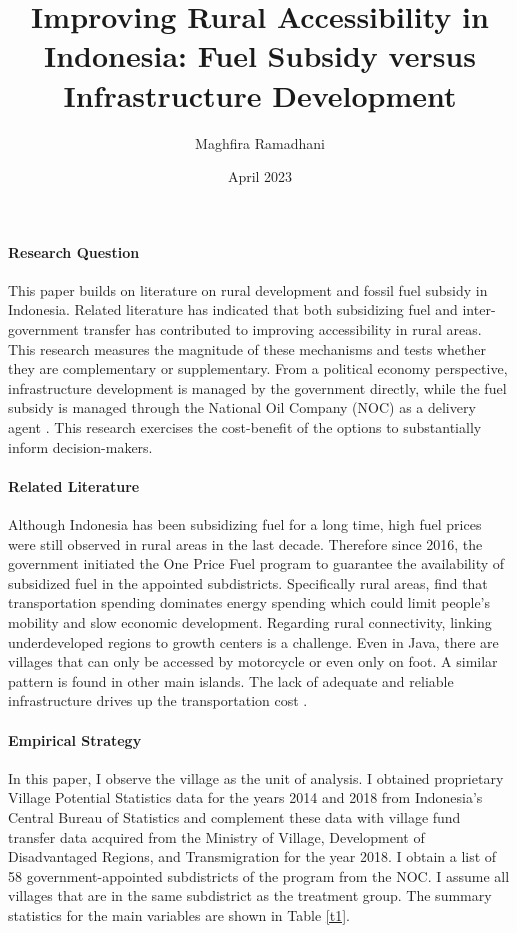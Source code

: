 \documentclass[letterpaper,11pt,leqno]{article}
\begin{document}
\title{Improving Rural Accessibility in Indonesia: Fuel Subsidy versus Infrastructure Development}
\author{Maghfira Ramadhani}
\date{April 2023}       
\maketitle
 
\paragraph{Research Question} This paper builds on literature on rural development and fossil fuel subsidy in Indonesia. Related literature has indicated that both subsidizing fuel and inter-government transfer has contributed to improving accessibility in rural areas. This research measures the magnitude of these mechanisms and tests whether they are complementary or supplementary. From a political economy perspective, infrastructure development is managed by the government directly, while the fuel subsidy is managed through the National Oil Company (NOC) as a delivery agent \citep{ichsan_2022}. This research exercises the cost-benefit of the options to substantially inform decision-makers.

\paragraph{Related Literature} Although Indonesia has been subsidizing fuel for a long time, high fuel prices were still observed in rural areas in the last decade. Therefore since 2016, the government initiated the One Price Fuel program to guarantee the availability of subsidized fuel in the appointed subdistricts. Specifically rural areas, \citet{sambodo_2019} find that transportation spending dominates energy spending which could limit people's mobility and slow economic development. Regarding rural connectivity, linking underdeveloped regions to growth centers is a challenge. Even in Java, there are villages that can only be accessed by motorcycle or even only on foot. A similar pattern is found in other main islands. The lack of adequate and reliable infrastructure drives up the transportation cost \citep{sandee_2016}.


\paragraph{Empirical Strategy} In this paper, I observe the village as the unit of analysis. I obtained proprietary Village Potential Statistics data for the years 2014 and 2018 from Indonesia's Central Bureau of Statistics and complement these data with village fund transfer data acquired from the Ministry of Village, Development of Disadvantaged Regions, and Transmigration for the year 2018. I obtain a list of 58 government-appointed subdistricts of the program from the NOC. I assume all villages that are in the same subdistrict as the treatment group. The summary statistics for the main variables are shown in Table \ref{t1}.
\end{document}
